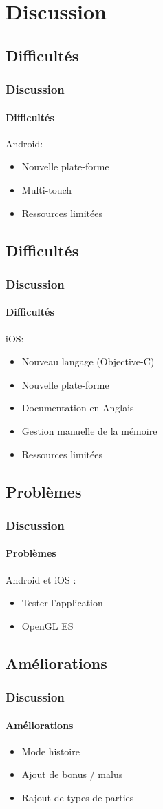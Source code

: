 \section{Discussion}

	\subsection{Difficultés}
		\begin{frame}
			\frametitle{Discussion}
			\framesubtitle{Difficultés}
			Android:
			\begin{itemize}
				\item Nouvelle plate-forme
				\item Multi-touch
				\item Ressources limitées
			\end{itemize}
		\end{frame}


	\subsection{Difficultés}
		\begin{frame}
			\frametitle{Discussion}
			\framesubtitle{Difficultés}
			iOS:
			\begin{itemize}
				\item Nouveau langage (Objective-C)
				\item Nouvelle plate-forme
				\item Documentation en Anglais
				\item Gestion manuelle de la mémoire
				\item Ressources limitées
			\end{itemize}
		\end{frame}
		
		
	\subsection{Problèmes}
		\begin{frame}
			\frametitle{Discussion}
			\framesubtitle{Problèmes}
			Android et iOS :
			\begin{itemize}
				\item Tester l'application
				\item OpenGL ES
			\end{itemize}
		\end{frame}
		
		
	\subsection{Améliorations}
		\begin{frame}
			\frametitle{Discussion}
			\framesubtitle{Améliorations}
			\begin{itemize}
				\item Mode histoire
				\item Ajout de bonus / malus
				\item Rajout de types de parties
			\end{itemize}
		\end{frame}
